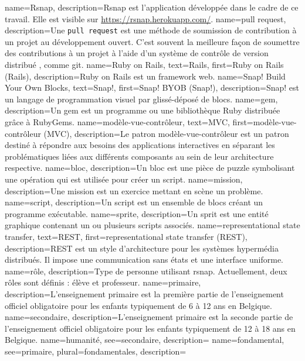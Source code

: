 

{
 name=Rsnap,
 description={Rsnap \cite{rsnap} est l'application développée dans le cadre de ce travail. Elle est visible sur \url{https://rsnap.herokuapp.com/}.}
}
{
 name={pull request},
 description={Une \texttt{pull request} est une méthode de soumission de contribution à un projet au développement ouvert. C'est  souvent la meilleure façon de soumettre des contributions à un projet à l'aide d'un système de contrôle de version distribué , comme git.}
}
{
 name={Ruby on Rails},
 text={Rails},
 first={Ruby on Rails (Rails)},
 description={Ruby on Rails \cite{rails} est un framework web.}
}
{
 name={Snap! Build Your Own Blocks},
 text={Snap!},
 first={Snap! BYOB (Snap!)},
 description={Snap! \cite{snap} est un langage de programmation visuel par glissé-déposé de \glspl{bloc}.}
}
{
 name={gem},
 description={Un gem \cite{gem} est un programme ou une bibliothèque Ruby distribuée grâce à RubyGems.}
}
{
 name={modèle-vue-contrôleur},
 text={MVC},
 first={modèle-vue-contrôleur (MVC)},
 description={Le patron modèle-vue-contrôleur \cite{wiki-mvc} est un patron destiné à répondre aux besoins des applications interactives en séparant les problématiques liées aux différents composants au sein de leur architecture respective.}
}
{
 name={bloc},
 description={Un bloc est une pièce de puzzle symbolisant une opération qui est utilisée pour créer un \gls{script}.}
}
{
 name={mission},
 description={Une mission est un exercice mettant en scène un problème.}
}
{
 name={script},
 description={Un script est un ensemble de blocs créant un programme exécutable.}
}
{
 name={sprite},
 description={Un sprit est une entité graphique contenant un ou plusieurs scripts associés.}
}
{
 name={representational state transfer},
 text={REST},
 first={representational state transfer (REST)},
 description={REST est un style d’architecture pour les systèmes hypermédia distribués. Il impose une communication sans états et une interface uniforme.}
}
{
 name={rôle},
 description={Type de personne utilisant \gls{rsnap}. Actuellement, deux rôles sont définis : élève et professeur.}
}
{
 name={primaire},
 description={L'enseignement primaire est la première partie de l'enseignement officiel obligatoire pour les enfants typiquement de 6 à 12 ans en Belgique.}
}
{
 name={secondaire},
 description={L'enseignement primaire est la seconde partie de l'enseignement officiel obligatoire pour les enfants typiquement de 12 à 18 ans en Belgique.}
}
{
 name={humanité},
 see=secondaire,
 description={}
}
{
 name={fondamental},
 see=primaire,
 plural={fondamentales},
 description={}
}
